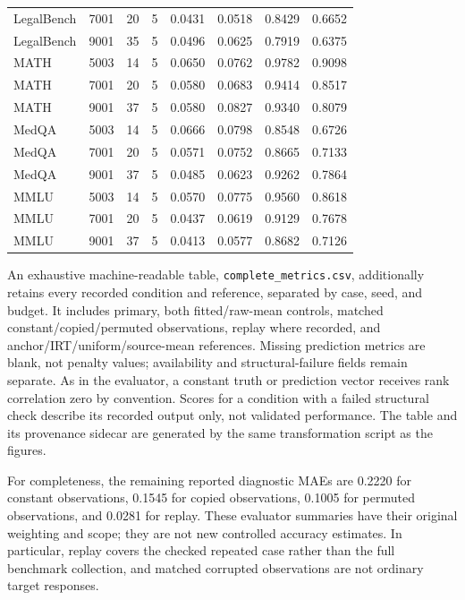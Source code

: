 \documentclass{article}
\begin{document}
\begin{table}[p]
\begin{tabular}{lrrrrrrr}
LegalBench & 7001 & 20 & 5 & 0.0431 & 0.0518 & 0.8429 & 0.6652 \\
LegalBench & 9001 & 35 & 5 & 0.0496 & 0.0625 & 0.7919 & 0.6375 \\
MATH & 5003 & 14 & 5 & 0.0650 & 0.0762 & 0.9782 & 0.9098 \\
MATH & 7001 & 20 & 5 & 0.0580 & 0.0683 & 0.9414 & 0.8517 \\
MATH & 9001 & 37 & 5 & 0.0580 & 0.0827 & 0.9340 & 0.8079 \\
MedQA & 5003 & 14 & 5 & 0.0666 & 0.0798 & 0.8548 & 0.6726 \\
MedQA & 7001 & 20 & 5 & 0.0571 & 0.0752 & 0.8665 & 0.7133 \\
MedQA & 9001 & 37 & 5 & 0.0485 & 0.0623 & 0.9262 & 0.7864 \\
MMLU & 5003 & 14 & 5 & 0.0570 & 0.0775 & 0.9560 & 0.8618 \\
MMLU & 7001 & 20 & 5 & 0.0437 & 0.0619 & 0.9129 & 0.7678 \\
MMLU & 9001 & 37 & 5 & 0.0413 & 0.0577 & 0.8682 & 0.7126 \\
\bottomrule
\end{tabular}
\end{table}

An exhaustive machine-readable table, \texttt{complete\_metrics.csv}, additionally retains every recorded condition and reference, separated by case, seed, and budget. It includes primary, both fitted/raw-mean controls, matched constant/copied/permuted observations, replay where recorded, and anchor/IRT/uniform/source-mean references. Missing prediction metrics are blank, not penalty values; availability and structural-failure fields remain separate. As in the evaluator, a constant truth or prediction vector receives rank correlation zero by convention. Scores for a condition with a failed structural check describe its recorded output only, not validated performance. The table and its provenance sidecar are generated by the same transformation script as the figures.

For completeness, the remaining reported diagnostic MAEs are 0.2220 for constant observations, 0.1545 for copied observations, 0.1005 for permuted observations, and 0.0281 for replay. These evaluator summaries have their original weighting and scope; they are not new controlled accuracy estimates. In particular, replay covers the checked repeated case rather than the full benchmark collection, and matched corrupted observations are not ordinary target responses.
\end{document}
